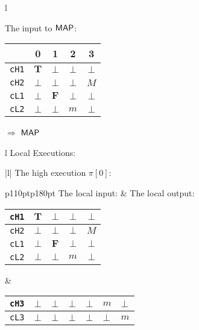 \documentclass[10pt,a4paper,oneside]{article}
\def\VTRUE{\ensuremath{\textbf{T}}}
\def\VFALSE{\ensuremath{\textbf{F}}}
\def\NIL{\ensuremath{\bot}}
\def\sanserif#1{\ensuremath{\sf #1}}
\def\MAP{\ensuremath{\sanserif{MAP}}}
\def\Prog{\ensuremath{\pi}}
\def\Progl#1{\ensuremath{\Prog[#1]}}
\def\linecode#1{{\texttt{#1}}}
\begin{document}
\begin{figure}[!t]


\begin{lrbox}{\mylistingbox}\begin{tabular}{l}
\hspace{3pt}
\begin{minipage}{183pt}
The input to \MAP:\\
\begin{tabular}{|c|c|c|c|c|}
	\hline
	\backslashbox{Channel}{Time} & 0 & 1 & 2 & 3  \\
    \hline
	\linecode{cH1} & $\VTRUE$ & \NIL & \NIL & \NIL\\
	\hline
	\linecode{cH2} & \NIL & \NIL & \NIL & $M$ \\
	\hline
	\linecode{cL1} & \NIL & \VFALSE & \NIL & \NIL\\
	\hline
	\linecode{cL2} & \NIL & \NIL & $m$ & \NIL\\
	\hline 
\end{tabular}  
\end{minipage} $\Longrightarrow$ \MAP \\

\begin{tabular}{l}
Local Executions: \\
\begin{tabular}{|l|}
\hline
The high execution \Progl{0}:\\
\begin{tabular}{p{110pt}p{180pt}}
The local input: & The local output:\\
\begin{tabular}{|c|c|c|c|c|}
	\hline
	\linecode{cH1} & $\VTRUE$ & \NIL & \NIL & \NIL\\
	\hline
	\linecode{cH2} & \NIL & \NIL & \NIL & $M$\\
	\hline
	\linecode{cL1} & \NIL & \VFALSE & \NIL & \NIL\\
	\hline
	\linecode{cL2} & \NIL & \NIL & $m$ & \NIL\\
	\hline
\end{tabular} & 
\begin{minipage}{105pt}
\begin{tabular}{|c|c|c|c|c|>{\centering\arraybackslash}p{25pt}|>{\centering\arraybackslash}p{25pt}|}
	\hline	
	\linecode{cH3} & \NIL & \NIL & \NIL & \NIL & $m$ & \NIL\\
	\hline
	\linecode{cL3} & \NIL & \NIL & \NIL & \NIL & \NIL & $m$\\
	\hline 	
\end{tabular}
\vspace{25pt}
\end{minipage} \\


\end{tabular}
\end{tabular}
\end{tabular}
\end{tabular}
\end{lrbox}
\end{figure}
\end{document}
